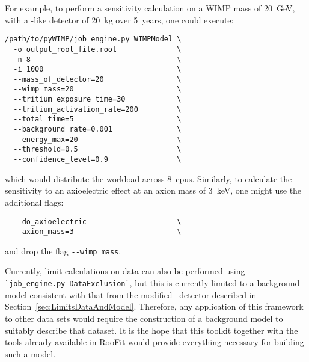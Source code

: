 For example, to perform a sensitivity calculation on a WIMP mass of 20~GeV, with a \MJ-like detector
of 20~kg over 5~years, one could execute:
				\begin{lstlisting}
/path/to/pyWIMP/job_engine.py WIMPModel	\
  -o output_root_file.root 				\
  -n 8 									\
  -i 1000 								\
  --mass_of_detector=20 				\
  --wimp_mass=20 						\
  --tritium_exposure_time=30			\
  --tritium_activation_rate=200			\
  --total_time=5 						\
  --background_rate=0.001 				\
  --energy_max=20 						\
  --threshold=0.5 						\ 
  --confidence_level=0.9 				\
				\end{lstlisting}
which would distribute the workload across 8~cpus.  Similarly, to calculate the sensitivity to an axioelectric effect at an axion
mass of 3~keV, one might use the additional flags:
				\begin{lstlisting}
  --do_axioelectric						\
  --axion_mass=3 						\
				\end{lstlisting}
and drop the flag \lstinline!--wimp_mass!.  

Currently, limit calculations on data can also be performed using \lstinline!`job_engine.py DataExclusion`!, but this is currently limited
to a background model consistent with that from the modified-\bege~detector described in Section~\ref{sec:LimitsDataAndModel}.  Therefore, any application of this framework to other data sets would require the construction of a background model to suitably 
describe that dataset.  It is the hope that this toolkit together with the tools already available in RooFit would provide
everything necessary for building such a model.
